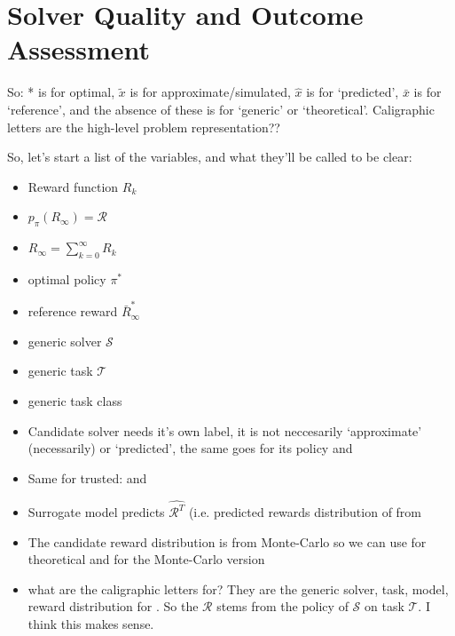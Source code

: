 \section{Solver Quality and Outcome Assessment}

So: * is for optimal, $\tilde{x}$ is for approximate/simulated, $\hat{x}$ is for `predicted', $\bar{x}$ is for `reference', and the absence of these is for `generic' or `theoretical'. Caligraphic letters are the high-level problem representation?? 

So, let's start a list of the variables, and what they'll be called to be clear:
\begin{itemize}
    \item Reward function $R_k$
    \item $p_{\pi}(R_{\infty})=\mathcal{R}$
    \item $R_{\infty}=\sum_{k=0}^{\infty}{R_k}$
    \item optimal policy $\pi^*$
    \item reference reward $\bar{R}_{\infty}^*$
    \item generic solver $\mathcal{S}$
    \item generic task $\mathcal{T}$
    \item generic task class \taskclass
    \item Candidate solver needs it's own label, it is not neccesarily `approximate' (necessarily) or `predicted', the same goes for its policy \solvecand{} and \picand
    \item Same for trusted: \solvetrust{} and \pitrust
    \item Surrogate model predicts $\hat{\mathcal{R}^T}$ (i.e. predicted rewards distribution of \solvetrust{} from \pitrust
    \item The candidate reward distribution is from Monte-Carlo so we can use \rwdcand{} for theoretical and \rwdcandsim{} for the Monte-Carlo version
    \item what are the caligraphic letters for? They are the generic solver, task, model, reward distribution for \xQ. So the $\mathcal{R}$ stems from the policy of $\mathcal{S}$ on task $\mathcal{T}$. I think this makes sense.
\end{itemize}

